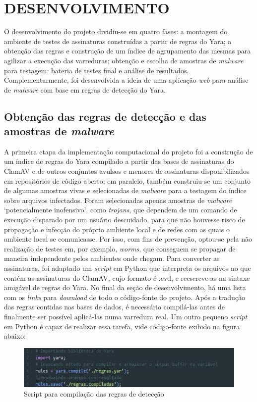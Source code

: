 \chapter{DESENVOLVIMENTO}
\label{c.Desenvolvimento}

O desenvolvimento do projeto dividiu-se em quatro fases: a montagem do ambiente de testes de assinaturas construídas
a partir de regras do Yara; a obtenção das regras e construção de um índice de agrupamento das mesmas para agilizar a
execução das varreduras; obtenção e escolha de amostras de \textit{malware} para testagem; bateria de testes final e
análise de resultados. Complementarmente, foi desenvolvida a ideia de uma aplicação \textit{web} para análise
de \textit{malware} com base em regras de detecção do Yara.

\section{Obtenção das regras de detecção e das amostras de \textit{malware}}
\label{s.obtregras}

A primeira etapa da implementação computacional do projeto foi a construção de um índice de regras do Yara compilado a partir das
bases de assinaturas do ClamAV e de outros conjuntos avulsos e menores de assinaturas disponibilizados em repositórios de código
aberto; em paralelo, também construiu-se um conjunto de algumas amostras vivas e selecionadas de \textit{malware} para a testagem
do índice sobre arquivos infectados. Foram selecionadas apenas amostras de \textit{malware} `potencialmente inofensivo', como
\textit{trojans}, que dependem de um comando de execução disparado por um usuário descuidado, para que não houvesse risco de
propagação e infecção do próprio ambiente local e de redes com as quais o ambiente local se comunicasse. Por isso, com fins de
prevenção, optou-se pela não realização de testes em, por exemplo, \textit{worms}, que conseguem se propagar de maneira independente
pelos ambientes onde chegam. Para converter as assinaturas, foi adaptado um \textit{script} em Python que interpreta os arquivos no
que contém as assinaturas do ClamAV, cujo formato é .cvd, e reescreve-as na sintaxe amigável de regras do Yara. No final da seção
de desenvolvimento, há uma lista com os \textit{links} para \textit{download} de todo o código-fonte do projeto. Após a tradução
das regras contidas nas bases de dados, é necessário compilá-las antes de finalmente ser possível aplicá-las numa varredura
real. Um outro pequeno \textit{script} em Python é capaz de realizar essa tarefa, vide código-fonte exibido na figura abaixo:
\begin{figure}
  \includegraphics[scale=0.6]{figs/script_conversao}
  \centering
  \caption{Script para compilação das regras de detecção}
  \label{f.script_comp}
\end{figure}


